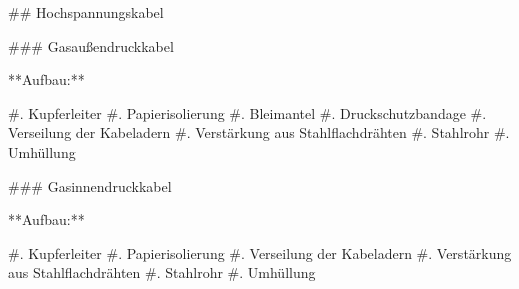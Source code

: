 \begin{markdown}
## Hochspannungskabel


### Gasaußendruckkabel

**Aufbau:**

#. Kupferleiter
#. Papierisolierung
#. Bleimantel
#. Druckschutzbandage
#. Verseilung der Kabeladern
#. Verstärkung aus Stahlflachdrähten
#. Stahlrohr
#. Umhüllung

### Gasinnendruckkabel

**Aufbau:**

#. Kupferleiter
#. Papierisolierung
#. Verseilung der Kabeladern
#. Verstärkung aus Stahlflachdrähten
#. Stahlrohr
#. Umhüllung

\end{markdown}
